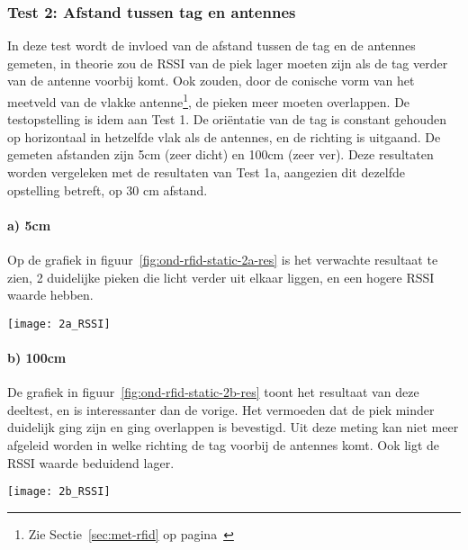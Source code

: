 \subsubsection{Test 2: Afstand tussen tag en antennes}
\label{sec:ond-rfid-2-2}
In deze test wordt de invloed van de afstand tussen de tag en de antennes gemeten, in theorie zou de RSSI van de piek lager moeten zijn als de tag verder van de antenne voorbij komt. Ook zouden, door de conische vorm van het meetveld van de vlakke antenne\footnote{Zie Sectie~\ref{sec:met-rfid} op pagina~\pageref{sec:met-rfid}}, de pieken meer moeten overlappen. De testopstelling is idem aan Test 1. De oriëntatie van de tag is constant gehouden op horizontaal in hetzelfde vlak als de antennes, en de richting is uitgaand. De gemeten afstanden zijn 5cm (zeer dicht) en 100cm (zeer ver). Deze resultaten worden vergeleken met de resultaten van Test 1a, aangezien dit dezelfde opstelling betreft, op 30 cm afstand.

\paragraph{a) 5cm}
\begin{minipage}{0.55\textwidth}
Op de grafiek in figuur~\ref{fig:ond-rfid-static-2a-res} is het verwachte resultaat te zien, 2 duidelijke pieken die licht verder uit elkaar liggen, en een hogere RSSI waarde hebben.
\end{minipage}
\hfill
\begin{minipage}{0.42\textwidth}
	\texttt{[image: 2a\_RSSI]}
	\label{fig:ond-rfid-static-2a-res}
\end{minipage}

\paragraph{b) 100cm}
\begin{minipage}{0.55\textwidth}
De grafiek in figuur~\ref{fig:ond-rfid-static-2b-res} toont het resultaat van deze deeltest, en is interessanter dan de vorige. Het vermoeden dat de piek minder duidelijk ging zijn en ging overlappen is bevestigd. Uit deze meting kan niet meer afgeleid worden in welke richting de tag voorbij de antennes komt. Ook ligt de RSSI waarde beduidend lager.
\end{minipage}
\hfill
\begin{minipage}{0.42\textwidth}
	\texttt{[image: 2b\_RSSI]}
	\label{fig:ond-rfid-static-2b-res}
\end{minipage}

